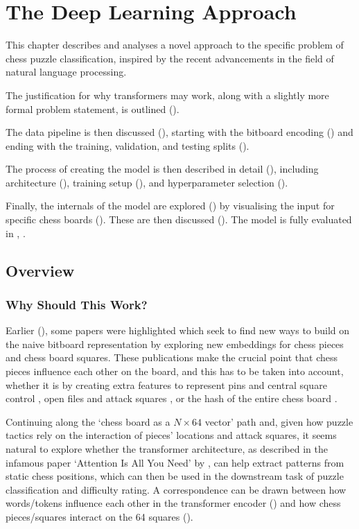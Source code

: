 \chapter{The Deep Learning Approach}\label{mlChapter}

This chapter describes and analyses a novel approach to the specific problem of
chess puzzle classification, inspired by the recent advancements in the field
of natural language processing.

The justification for why transformers may work, along with a slightly more
formal problem statement, is outlined ().

The data pipeline is then discussed (), starting with the bitboard
encoding () and ending with the training, validation, and testing
splits ().

The process of creating the model is then described in detail (),
including architecture (), training setup (), and
hyperparameter selection ().

Finally, the internals of the model are explored () by visualising
the input for specific chess boards (). These are then discussed
(). The model is fully evaluated in , .


\section{Overview}\label{mlS0}

\subsection{Why Should This Work?}

Earlier (), some papers were highlighted which seek to find new ways
to build on the naive bitboard representation by exploring new embeddings for
chess pieces and chess board squares. These publications make the crucial point
that chess pieces influence each other on the board, and this has to be taken
into account, whether it is by creating extra features to represent pins and
central square control \citep{chessCNN}, open files and attack squares
\citep{middleGamePatterns}, or the hash of the entire chess board
\citep{chess2vec}.

Continuing along the `chess board as a $N\times64$ vector' path and, given how
puzzle tactics rely on the interaction of pieces' locations and attack squares,
it seems natural to explore whether the transformer architecture, as described
in the infamous paper `Attention Is All You Need' by \citet{attention}, can
help extract patterns from static chess positions, which can then be used in
the downstream task of puzzle classification and difficulty rating. A
correspondence can be drawn between how words/tokens influence each other in
the transformer encoder () and how chess pieces/squares
interact on the 64 squares ().

